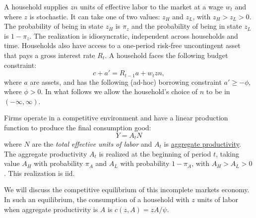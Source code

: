\documentclass[11pt,english]{article}
\begin{document}
A household supplies $zn$ units of effective labor to the market at a wage
$w_t$ and where $z$ is stochastic. It can take one of two values: $z_H$ and
$z_L$, with $z_H > z_L > 0$. The probability of being in state $z_H$ is
$\pi_z$ and the probability of being in state $z_L$ is $1 - \pi_z$. The
realization is idiosyncratic, independent across households and time.
Households also have access to a one-period risk-free uncontingent asset that
pays a gross interest rate $R_t$. A household faces the following budget
constraint:
\[
    c + a' = R_{t-1} a + w_t z n,
\]
where $a$ are assets, and has the following (ad-hoc) borrowing constraint
$a' \geq -\phi$, where $\phi > 0$. In what follows we allow the household's
choice of $n$ to be in $(-\infty, \infty)$.
 
Firms operate in a competitive environment and have a linear production
function to produce the final consumption good:
\[
    Y = A_t N
\]
where $N$ are the \emph{total effective units of labor} and $A_t$ is
\underline{aggregate productivity}. The aggregate productivity $A_t$ is
realized at the beginning of period $t$, taking value $A_H$ with probability
$\pi_A$ and $A_L$ with probability $1 - \pi_A$, with $A_H > A_L > 0$. This
realization is iid.
 
We will discuss the competitive equilibrium of this incomplete markets economy.
In such an equilibrium, the consumption of a household with $z$ units of labor
when aggregate productivity is $A$ is $c(z, A) = zA/\psi$.
 
\end{document}
